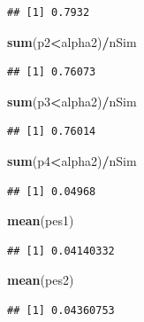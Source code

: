 \documentclass[]{article}
\newenvironment{Shaded}{\begin{snugshade}}{\end{snugshade}}
\newcommand{\KeywordTok}[1]{\textcolor[rgb]{0.13,0.29,0.53}{\textbf{#1}}}
\newcommand{\OperatorTok}[1]{\textcolor[rgb]{0.81,0.36,0.00}{\textbf{#1}}}
\newcommand{\NormalTok}[1]{#1}
\begin{document}
\begin{verbatim}
## [1] 0.7932
\end{verbatim}

\begin{Shaded}
\begin{Highlighting}[]
\KeywordTok{sum}\NormalTok{(p2}\OperatorTok{<}\NormalTok{alpha2)}\OperatorTok{/}\NormalTok{nSim}
\end{Highlighting}
\end{Shaded}

\begin{verbatim}
## [1] 0.76073
\end{verbatim}

\begin{Shaded}
\begin{Highlighting}[]
\KeywordTok{sum}\NormalTok{(p3}\OperatorTok{<}\NormalTok{alpha2)}\OperatorTok{/}\NormalTok{nSim}
\end{Highlighting}
\end{Shaded}

\begin{verbatim}
## [1] 0.76014
\end{verbatim}

\begin{Shaded}
\begin{Highlighting}[]
\KeywordTok{sum}\NormalTok{(p4}\OperatorTok{<}\NormalTok{alpha2)}\OperatorTok{/}\NormalTok{nSim}
\end{Highlighting}
\end{Shaded}

\begin{verbatim}
## [1] 0.04968
\end{verbatim}

\begin{Shaded}
\begin{Highlighting}[]
\KeywordTok{mean}\NormalTok{(pes1)}
\end{Highlighting}
\end{Shaded}

\begin{verbatim}
## [1] 0.04140332
\end{verbatim}

\begin{Shaded}
\begin{Highlighting}[]
\KeywordTok{mean}\NormalTok{(pes2)}
\end{Highlighting}
\end{Shaded}

\begin{verbatim}
## [1] 0.04360753
\end{verbatim}
\end{document}
